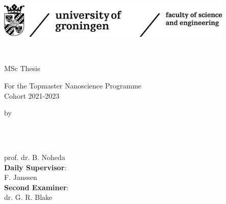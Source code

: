 \begin{titlepage}
\begin{center}

\parbox[c]{\textwidth}{\includegraphics[height=17mm]{title/logos/RUG_Logo_FSE_Black.png}}\\
  \vfill
  
\vspace*{2\bigskipamount}

{\makeatletter
\titlestyle\bfseries\LARGE\@title
\makeatother}

{\makeatletter
\ifx\@subtitle\undefined\else
    \bigskip
    \titlefont\titleshape\Large\@subtitle
\fi
\makeatother}

\bigskip
\bigskip
\vfill


{\large\titlefont\series MSc Thesis}

\bigskip

For the Topmaster Nanoscience Programme\\
Cohort 2021-2023

\bigskip

by

\bigskip
\bigskip

\makeatletter
{\Large\titlefont\bfseries\@firstname\ {\titleshape\@lastname}}
\makeatother
\end{center}

\bigskip
\bigskip
\bigskip

\vfill
{}\\[1ex]
            {\large prof. dr. B. Noheda}\\[3ex]
            {\large \textbf{Daily Supervisor}:}\\[1ex]   
            {\large F. Janssen}\\[3ex]
   {\large \textbf{Second Examiner}:}\\[1ex]
   {\large dr. G. R. Blake}
%
  \vfill

\end{titlepage}